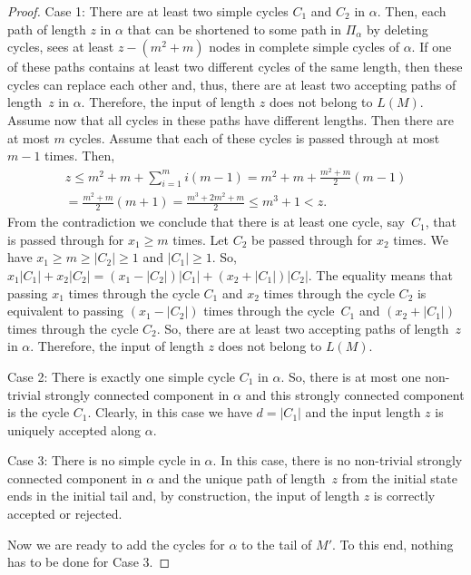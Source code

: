 \documentclass[final,copyright,noderivs]{eptcs}
\theoremstyle{plain}
\theoremstyle{definition}
\begin{document}
\begin{proof}
Case 1: There are at least two simple cycles $C_1$ and $C_2$ in $\alpha$.
Then, each path of length $z$ in $\alpha$
that can be shortened to some path in $\Pi_\alpha$ by deleting cycles, sees 
at least $z-(m^2+m)$ nodes in complete simple cycles of $\alpha$. 
If one of these paths contains at least two
different cycles of the same length, then these cycles can replace each other
and, thus, there are at least two accepting paths of length~$z$ in $\alpha$.
Therefore, the input of length $z$ does not belong to $L(M)$. Assume now that
all cycles in these paths have different lengths. Then there are at most $m$
cycles. Assume that each of these cycles is passed through at most $m-1$
times. Then,
\begin{multline*}
z\leq m^2+m + \sum_{i=1}^{m} i (m-1) = m^2+m + \frac{m^2+m}{2} (m-1)\\
= \frac{m^2+m}{2} (m+1)
= \frac{m^3+2m^2+m}{2}
\leq m^3+1 < z.
\end{multline*}
From the contradiction we conclude that there is at least one cycle, say~$C_1$,
that is passed through for $x_1\geq m$ times. Let $C_2$ be passed
through for $x_2$ times. We have $x_1\geq m \geq |C_2|\geq 1$ and $|C_1|\geq 1$.
So, $x_1 |C_1| + x_2 |C_2| = (x_1-|C_2|)|C_1| + (x_2 + |C_1|) |C_2|$.
The equality means that passing $x_1$ times through the cycle $C_1$ and $x_2$
times through the cycle $C_2$ is equivalent to passing $(x_1-|C_2|)$ times
through the cycle~$C_1$ and $(x_2 + |C_1|)$ times through the cycle $C_2$.
So, there are at least two accepting paths of length~$z$ in $\alpha$.
Therefore, the input of length $z$ does not belong to $L(M)$.

Case 2: There is exactly one simple cycle $C_1$ in $\alpha$.
So, there is at most one non-trivial strongly connected component in $\alpha$
and this strongly connected component is the cycle $C_1$. 
Clearly, in this case we have $d= |C_1|$ and the input length $z$ is uniquely
accepted along $\alpha$.

Case 3: There is no simple cycle in $\alpha$. 
In this case, there is no non-trivial strongly connected component in $\alpha$ and 
the unique path of length~$z$ from the initial state 
ends in the initial tail and, by construction, the input
of length $z$ is correctly accepted or rejected.

Now we are ready to add the cycles for $\alpha$ to the tail of $M'$. 
To this end, nothing has to be done for Case 3. 


\end{proof}
\end{document}
